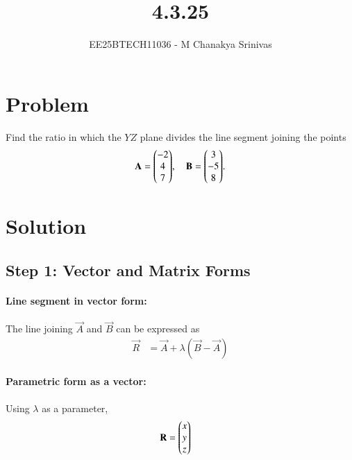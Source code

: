 \documentclass[journal]{IEEEtran}
\begin{document}

\vspace{3cm}

\title{4.3.25}
\author{EE25BTECH11036 - M Chanakya Srinivas}
\maketitle

\renewcommand{\thetable}{\theenumi}
\setlength{\intextsep}{10pt}
\renewcommand\theequation{\arabic{equation}}





\section*{Problem}
Find the ratio in which the $YZ$ plane divides the line segment joining the points 
$$
\mathbf{A} = \mathbf{\begin{pmatrix}-2\\4\\7\end{pmatrix}}, \quad 
\mathbf{B} = \mathbf{\begin{pmatrix}3\\-5\\8\end{pmatrix}}.
$$

\section*{Solution}

\subsection*{Step 1: Vector and Matrix Forms}

\paragraph{Line segment in vector form:} The line joining $\vec{A}$ and $\vec{B}$ can be expressed as
\begin{align}
\vec{R} &= \vec{A} + \lambda (\vec{B}-\vec{A}) \label{eq:line_vector}
\end{align}

\paragraph{Parametric form as a vector:} Using $\lambda$ as a parameter,
\begin{align}
\mathbf{R} &= \mathbf{\begin{pmatrix}x\\y\\z\end{pmatrix}} \label{eq:R_vector}
\end{align}
\end{document}
